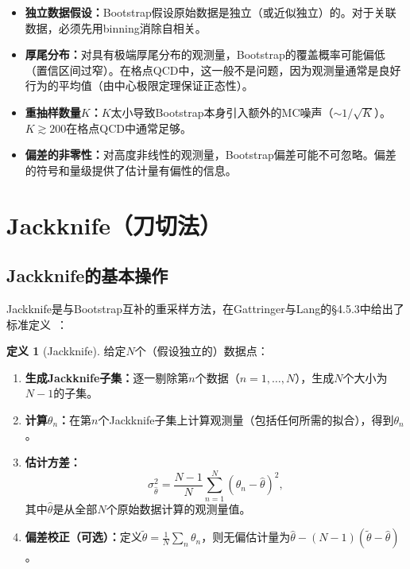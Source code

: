 \documentclass[12pt,a4paper]{ctexart}
\theoremstyle{definition}
\newtheorem{definition}{定义}[section]
\begin{document}
\begin{itemize}[nosep]
    \item \textbf{独立数据假设：}Bootstrap假设原始数据是独立（或近似独立）的。对于关联数据，必须先用binning消除自相关。
    \item \textbf{厚尾分布：}对具有极端厚尾分布的观测量，Bootstrap的覆盖概率可能偏低（置信区间过窄）。在格点QCD中，这一般不是问题，因为观测量通常是良好行为的平均值（由中心极限定理保证正态性）。
    \item \textbf{重抽样数量$K$：}$K$太小导致Bootstrap本身引入额外的MC噪声（$\sim 1/\sqrt{K}$）。$K \gtrsim 200$在格点QCD中通常足够。
    \item \textbf{偏差的非零性：}对高度非线性的观测量，Bootstrap偏差可能不可忽略。偏差的符号和量级提供了估计量有偏性的信息。
\end{itemize}

\section{Jackknife（刀切法）}

\subsection{Jackknife的基本操作}

Jackknife是与Bootstrap互补的重采样方法，在Gattringer与Lang的§4.5.3中给出了标准定义~\cite{GattringerLang2010}：

\begin{definition}[Jackknife]
给定$N$个（假设独立的）数据点：
\begin{enumerate}[nosep]
    \item \textbf{生成Jackknife子集：}逐一剔除第$n$个数据（$n = 1, \dots, N$），生成$N$个大小为$N-1$的子集。
    \item \textbf{计算$\theta_n$：}在第$n$个Jackknife子集上计算观测量（包括任何所需的拟合），得到$\theta_n$。
    \item \textbf{估计方差：}
    \begin{equation}
    \boxed{\sigma^2_{\hat\theta} = \frac{N-1}{N} \sum_{n=1}^N (\theta_n - \hat\theta)^2},
    \label{eq:jackknife_variance}
    \end{equation}
    其中$\hat\theta$是从全部$N$个原始数据计算的观测量值。
    \item \textbf{偏差校正（可选）：}定义$\tilde\theta = \frac{1}{N}\sum_n \theta_n$，则无偏估计量为$\hat\theta - (N-1)(\tilde\theta - \hat\theta)$。
\end{enumerate}
\end{definition}
\end{document}
